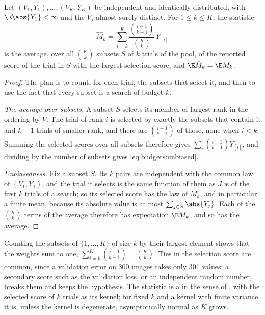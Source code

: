 \begin{refsection}
\begin{theorem}\label{thm:budgets:unbiased}
Let $(V_1,Y_1),\dots,(V_K,Y_K)$ be independent and identically distributed, with $\E\abs{Y_1}<\infty$ and the $V_j$ almost surely distinct. For $1\le k\le K$, the statistic
\begin{equation}\label{eq:budgets:unbiased}
  \hat M_k=\sum_{i=k}^{K}\frac{\binom{i-1}{k-1}}{\binom Kk}\,Y_{[i]}
\end{equation}
is the average, over all $\binom Kk$ subsets $S$ of $k$ trials of the pool, of the reported score of the trial in $S$ with the largest selection score, and $\E\hat M_k=\E M_k$.
\end{theorem}

\begin{proof}
The plan is to count, for each trial, the subsets that select it, and then to use the fact that every subset is a search of budget $k$.

\emph{The average over subsets.} A subset $S$ selects its member of largest rank in the ordering by $V$. The trial of rank $i$ is selected by exactly the subsets that contain it and $k-1$ trials of smaller rank, and there are $\binom{i-1}{k-1}$ of those, none when $i<k$. Summing the selected scores over all subsets therefore gives $\sum_i\binom{i-1}{k-1}Y_{[i]}$, and dividing by the number of subsets gives \eqref{eq:budgets:unbiased}.

\emph{Unbiasedness.} Fix a subset $S$. Its $k$ pairs are independent with the common law of $(V_1,Y_1)$, and the trial it selects is the same function of them as $J$ is of the first $k$ trials of a search; so its selected score has the law of $M_k$, and in particular a finite mean, because its absolute value is at most $\sum_{j\in S}\abs{Y_j}$. Each of the $\binom Kk$ terms of the average therefore has expectation $\E M_k$, and so has the average.
\end{proof}

Counting the subsets of $\{1,\dots,K\}$ of size $k$ by their largest element shows that the weights sum to one, $\sum_{i=k}^K\binom{i-1}{k-1}=\binom Kk$. Ties in the selection score are common, since a validation error on 300 images takes only 301 values; a secondary score such as the validation loss, or an independent random number, breaks them and keeps the hypothesis. The statistic is a  in the sense of \textcite{Hoeffding1948}, with the selected score of $k$ trials as its kernel; for fixed $k$ and a kernel with finite variance it is, unless the kernel is degenerate, asymptotically normal as $K$ grows.


\end{refsection}
